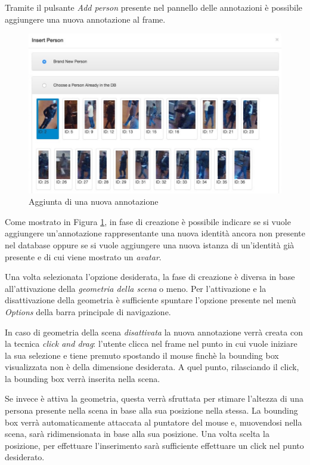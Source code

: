 Tramite il pulsante \emph{Add person} presente nel pannello delle annotazioni è possibile aggiungere una nuova annotazione al frame. 

\begin{figure}[h]
\centering
\includegraphics[width=0.8\linewidth]{images/add-person.jpg}
  \caption{Aggiunta di una nuova annotazione}
  \label{fig:addperson}
\end{figure}

Come mostrato in Figura \ref{fig:addperson}, in fase di creazione è possibile indicare se si vuole aggiungere un'annotazione rappresentante una nuova identità ancora non presente nel database oppure se si vuole aggiungere una nuova istanza di un'identità già presente e di cui viene mostrato un \emph{avatar}.

Una volta selezionata l'opzione desiderata, la fase di creazione è diversa in base all'attivazione della \emph{geometria della scena} o meno. Per l'attivazione e la disattivazione della geometria è sufficiente spuntare l'opzione presente nel menù \emph{Options} della barra principale di navigazione.

In caso di geometria della scena \emph{disattivata} la nuova annotazione verrà creata con la tecnica \emph{click and drag}: l'utente clicca nel frame nel punto in cui vuole iniziare la sua selezione e tiene premuto spostando il mouse finchè la bounding box visualizzata non è della dimensione desiderata. A quel punto, rilasciando il click, la bounding box verrà inserita nella scena.

Se invece è attiva la geometria, questa verrà sfruttata per stimare l'altezza di una persona presente nella scena in base alla sua posizione nella stessa. La bounding box verrà automaticamente attaccata al puntatore del mouse e, muovendosi nella scena, sarà ridimensionata in base alla sua posizione. Una volta scelta la posizione, per effettuare l'inserimento sarà sufficiente effettuare un click nel punto desiderato. 

